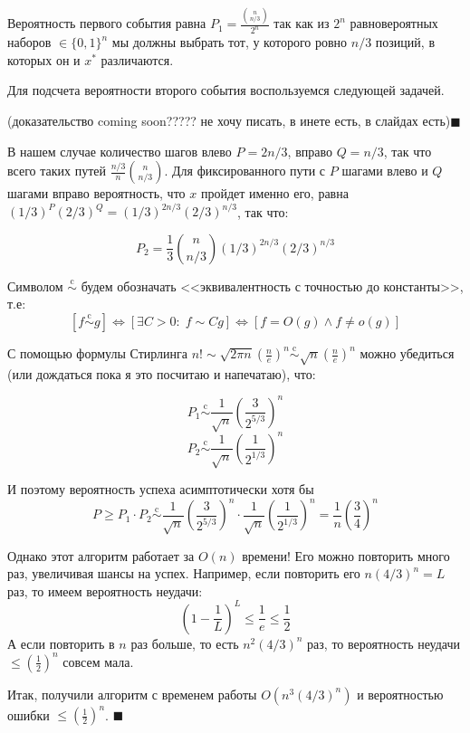 Вероятность первого события равна $P_1 = \frac{{n\choose{n/3}}}{2^n}$ так как из $2^n$ равновероятных наборов $\in \{0, 1\}^n$ мы должны выбрать тот, у которого ровно $n/3$ позиций, в которых он и $x^*$ различаются. 

Для подсчета вероятности второго события воспользуемся следующей задачей.


(доказательство coming soon????? не хочу писать, в инете есть, в слайдах есть)$\blacksquare$
\needpicture

В нашем случае количество шагов влево $P = 2n/3$, вправо $Q=n/3$, так что всего таких путей $\frac{n/3}{n}{n\choose n/3}$. Для фиксированного пути с $P$ шагами влево и $Q$ шагами вправо вероятность, что $x$ пройдет именно его, равна $(1/3)^P (2/3)^Q = (1/3)^{2n/3} (2/3)^{n/3}$, так что:

$$P_2 = \frac{1}{3} {n\choose n/3} (1/3)^{2n/3} (2/3)^{n/3}$$

\newcommand{\scm}{\overset{\text{c}}{\sim}}
Символом $\scm$ будем обозначать <<эквивалентность с точностью до константы>>, т.е: $$[f \scm g] \iff [\exists C > 0: \; f \sim Cg] \iff [f = O(g) \wedge f \neq o(g)]$$

С помощью формулы Стирлинга $n! \sim \sqrt{2\pi n}(\frac{n}{e})^n \scm \sqrt{n}(\frac{n}{e})^n$ можно убедиться (или дождаться пока я это посчитаю и напечатаю), что:

$$ P_1 \scm \frac{1}{\sqrt n}(\frac{3}{2^{5/3}})^n$$
$$ P_2 \scm \frac{1}{\sqrt n}(\frac{1}{2^{1/3}})^n$$

И поэтому вероятность успеха асимптотически хотя бы 
$$P \geq P_1 \cdot P_2 \scm \frac{1}{\sqrt n}(\frac{3}{2^{5/3}})^n \cdot \frac{1}{\sqrt n}(\frac{1}{2^{1/3}})^n = \frac{1}{n}(\frac{3}{4})^n$$

Однако этот алгоритм работает за $O(n)$ времени! Его можно повторить много раз, увеличивая шансы на успех. Например, если повторить его $n(4/3)^n = L$ раз, то имеем вероятность неудачи:
$$(1-\frac{1}{L})^L \leq \frac{1}{e} \leq \frac{1}{2}$$
А если повторить в $n$ раз больше, то есть $n^2(4/3)^n$ раз, то вероятность неудачи $\leq (\frac{1}{2})^n$ совсем мала.

Итак, получили алгоритм с временем работы $O(n^3(4/3)^n)$ и вероятностью ошибки $\leq (\frac{1}{2})^n$. $\blacksquare$











